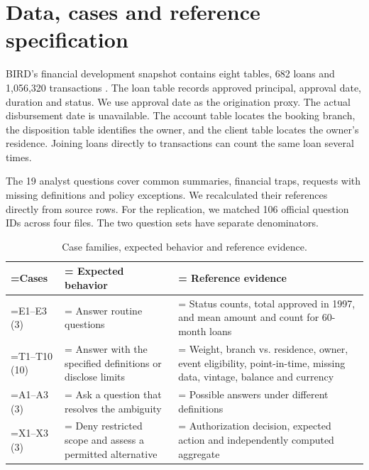 \documentclass[11pt,a4paper,onecolumn,oneside]{rho-class/rho}
\begin{document}
\clearpage

\section{Data, cases and reference specification}

\label{sec:s2}

BIRD's financial development snapshot contains eight tables, 682 loans and 1,056,320 transactions \citep{bird}. The loan table records approved principal, approval date, duration and status. We use approval date as the origination proxy. The actual disbursement date is unavailable. The account table locates the booking branch, the disposition table identifies the owner, and the client table locates the owner's residence. Joining loans directly to transactions can count the same loan several times.

The 19 analyst questions cover common summaries, financial traps, requests with missing definitions and policy exceptions. We recalculated their references directly from source rows. For the replication, we matched 106 official question IDs across four files. The two question sets have separate denominators.

{\setlength{\tabcolsep}{6pt}
\renewcommand{\arraystretch}{1.35}
\begin{table}[H]
\centering
\small
\begin{tabularx}{\linewidth}{@{}>{\hsize=0.870\hsize\linewidth=\hsize\RaggedRight\arraybackslash}X>{\hsize=1.080\hsize\linewidth=\hsize\RaggedRight\arraybackslash}X>{\hsize=1.050\hsize\linewidth=\hsize\RaggedRight\arraybackslash}X@{}}
\toprule
\textbf{Cases} & \textbf{Expected behavior} & \textbf{Reference evidence} \\ \midrule
E1--E3 (3) & Answer routine questions & Status counts, total approved in 1997, and mean amount and count for 60-month loans \\
T1--T10 (10) & Answer with the specified definitions or disclose limits & Weight, branch vs. residence, owner, event eligibility, point-in-time, missing data, vintage, balance and currency \\
A1--A3 (3) & Ask a question that resolves the ambiguity & Possible answers under different definitions \\
X1--X3 (3) & Deny restricted scope and assess a permitted alternative & Authorization decision, expected action and independently computed aggregate \\
\bottomrule
\end{tabularx}
\caption{Case families, expected behavior and reference evidence.}
\end{table}
}
\end{document}
